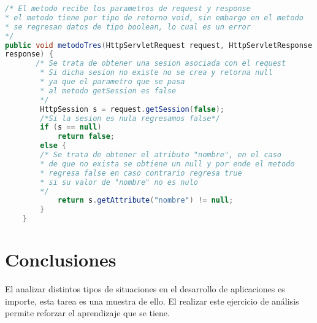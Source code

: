 \documentclass[a4paper,12pt]{article}
\begin{document}
\begin{lstlisting}[language=Java, style=customJava, 
caption={Método Tres}, captionpos=b, basicstyle=\fontfamily{cmss}\small]
/* El metodo recibe los parametros de request y response
* el metodo tiene por tipo de retorno void, sin embargo en el metodo
* se regresan datos de tipo boolean, lo cual es un error
*/
public void metodoTres(HttpServletRequest request, HttpServletResponse 
response) {
       /* Se trata de obtener una sesion asociada con el request
        * Si dicha sesion no existe no se crea y retorna null 
        * ya que el parametro que se pasa
        * al metodo getSession es false
        */
        HttpSession s = request.getSession(false);
        /*Si la sesion es nula regresamos false*/
        if (s == null)
            return false;
        else {
        /* Se trata de obtener el atributo "nombre", en el caso
        * de que no exista se obtiene un null y por ende el metodo
        * regresa false en caso contrario regresa true
        * si su valor de "nombre" no es nulo
        */
            return s.getAttribute("nombre") != null;
        }
    }
\end{lstlisting}

\section{Conclusiones}
El analizar distintos tipos de situaciones en el desarrollo de aplicaciones es 
importe, esta tarea es una muestra de ello. El realizar este ejercicio de 
análisis permite reforzar el aprendizaje que se tiene.
\end{document}
